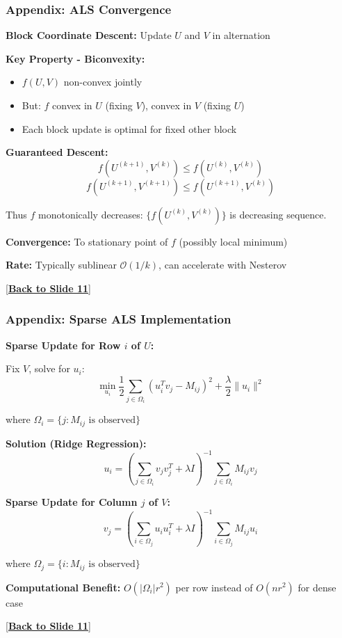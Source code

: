\documentclass[aspectratio=169,usenames,dvipsnames]{beamer}
\begin{document}
\begin{frame}[label=app:als_convergence]
\frametitle{Appendix: ALS Convergence}

\textbf{Block Coordinate Descent:} Update $U$ and $V$ in alternation

\vspace{0.3cm}

\textbf{Key Property - Biconvexity:}
\begin{itemize}
  \item $f(U, V)$ non-convex jointly
  \item But: $f$ convex in $U$ (fixing $V$), convex in $V$ (fixing $U$)
  \item Each block update is optimal for fixed other block
\end{itemize}

\vspace{0.3cm}

\textbf{Guaranteed Descent:}
\[
f(U^{(k+1)}, V^{(k)}) \leq f(U^{(k)}, V^{(k)})
\]
\[
f(U^{(k+1)}, V^{(k+1)}) \leq f(U^{(k+1)}, V^{(k)})
\]

Thus $f$ monotonically decreases: $\{f(U^{(k)}, V^{(k)})\}$ is decreasing sequence.

\vspace{0.3cm}

\textbf{Convergence:} To stationary point of $f$ (possibly local minimum)

\textbf{Rate:} Typically sublinear $\mathcal{O}(1/k)$, can accelerate with Nesterov

\hyperlink{11}{[\textbf{Back to Slide 11}]}

\end{frame}

\begin{frame}[label=app:als_sparse]
\frametitle{Appendix: Sparse ALS Implementation}

\textbf{Sparse Update for Row $i$ of $U$:}

Fix $V$, solve for $u_i$:
\[
\min_{u_i} \frac{1}{2}\sum_{j \in \Omega_i} (u_i^T v_j - M_{ij})^2 + \frac{\lambda}{2}\|u_i\|^2
\]

where $\Omega_i = \{j : M_{ij} \text{ is observed}\}$

\vspace{0.3cm}

\textbf{Solution (Ridge Regression):}
\[
u_i = \left(\sum_{j \in \Omega_i} v_j v_j^T + \lambda I\right)^{-1} \sum_{j \in \Omega_i} M_{ij} v_j
\]

\vspace{0.3cm}

\textbf{Sparse Update for Column $j$ of $V$:}
\[
v_j = \left(\sum_{i \in \Omega_j} u_i u_i^T + \lambda I\right)^{-1} \sum_{i \in \Omega_j} M_{ij} u_i
\]

where $\Omega_j = \{i : M_{ij} \text{ is observed}\}$

\vspace{0.3cm}

\textbf{Computational Benefit:} $O(|\Omega_i| r^2)$ per row instead of $O(nr^2)$ for dense case

\hyperlink{11}{[\textbf{Back to Slide 11}]}

\end{frame}
\end{document}

